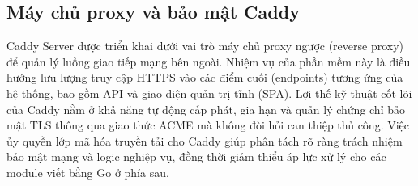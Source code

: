 \subsection{Máy chủ proxy và bảo mật Caddy}
Caddy Server được triển khai dưới vai trò máy chủ proxy ngược (reverse proxy) để quản lý luồng giao tiếp mạng bên ngoài. Nhiệm vụ của phần mềm này là điều hướng lưu lượng truy cập HTTPS vào các điểm cuối (endpoints) tương ứng của hệ thống, bao gồm API và giao diện quản trị tĩnh (SPA). Lợi thế kỹ thuật cốt lõi của Caddy nằm ở khả năng tự động cấp phát, gia hạn và quản lý chứng chỉ bảo mật TLS thông qua giao thức ACME mà không đòi hỏi can thiệp thủ công. Việc ủy quyền lớp mã hóa truyền tải cho Caddy giúp phân tách rõ ràng trách nhiệm bảo mật mạng và logic nghiệp vụ, đồng thời giảm thiểu áp lực xử lý cho các module viết bằng Go ở phía sau.
